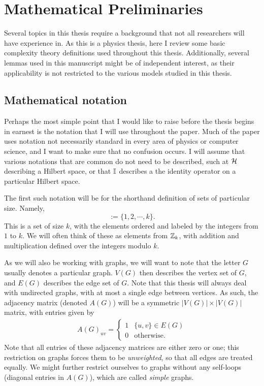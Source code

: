 \documentclass[../thesis-main/thesis-main]{subfiles}
\begin{document}
\chapter{Mathematical Preliminaries}
\label{chap:mathematical_preliminaries}


Several topics in this thesis require a background that not all researchers will have experience in.  As this is a physics thesis, here I review some basic complexity theory definitions used throughout this thesis.  Additionally, several lemmas used in this manuscript might be of independent interest, as their applicability is not restricted to the various models studied in this thesis. 

\section{Mathematical notation}
\label{sec:mathematical_notation}

Perhaps the most simple point that I would like to raise before the thesis begins in earnest is the notation that I will use throughout the paper.  Much of the paper uses notation not necessarily standard in every area of physics or computer science, and I want to make sure that no confusion occurs.  I will assume that various notations that are common do not need to be described, such at $\mathcal{H}$ describing a Hilbert space, or that $\mathbb{I}$ describes a the identity operator on a particular Hilbert space.

The first such notation will be for the shorthand definition of sets of particular size.  Namely,
\begin{equation}
[k] := \{1,2,\cdots, k\}.
\end{equation}
This is a set of size $k$, with the elements ordered and labeled by the integers from $1$ to $k$.  We will often think of these as elements from $\mathbb{Z}_{k}$, with addition and multiplication defined over the integers modulo $k$.

As we will also be working with graphs, we will want to note that the letter $G$ usually denotes a particular graph.  $V(G)$ then describes the vertex set of $G$, and $E(G)$ describes the edge set of $G$.  Note that this thesis will always deal with undirected graphs, with at most a single edge between vertices.  As such, the adjacency matrix (denoted $A(G)$) will be a symmetric $|V(G)|\times|V(G)|$ matrix, with entries given by 
\begin{align}
A(G)_{uv} = \begin{cases}
 1 & \{u,v\}\in E(G)\\
 0 & \text{otherwise}.
\end{cases}
\end{align}  Note that all entries of these adjacency matrices are either zero or one; this restriction on graphs forces them to be \emph{unweighted}, so that all edges are treated equally.  We might further restrict ourselves to graphs without any self-loops (diagonal entries in $A(G)$), which are called \emph{simple} graphs.
\end{document}
